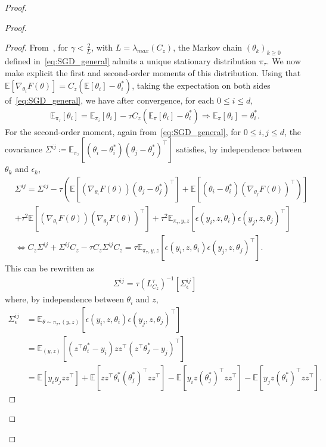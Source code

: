 \documentclass[11pt]{article}
\newcommand{\eqdef}{\coloneqq}
\newcommand{\EE}{\mathbb{E}}
\begin{document}
\begin{proof}
\begin{proof}
\begin{proof}
From~\cite[Proposition 2, Example 1]{dieuleveut2020bridging}, for $\gamma < \frac{2}{L}$, with $L = \lambda_{max}(C_z)$, the Markov chain $(\theta_k)_{k \geq 0}$ defined in~\eqref{eq:SGD_general} admits a unique stationary distribution $\pi_\tau$. We now make explicit the first and second-order moments of this distribution.  Using that $\EE[\nabla_{\theta_i} F(\theta)] = C_z( \EE[\theta_i] - \theta_i^*) $, taking the expectation on both sides of~\eqref{eq:SGD_general}, we have after convergence, for each $0 \leq i \leq d$,
\begin{align*}
\EE_{\pi_\tau}[\theta_i] = \EE_{\pi_i}[\theta_i] - \tau C_z( \EE_{\pi}[\theta_i] - \theta_i^*) \Longrightarrow \EE_{\pi}[\theta_i] = \theta_i^* .
\end{align*}
For the second-order moment, again from~\eqref{eq:SGD_general}, for $0 \leq i,j \leq d$, the covariance ${\Sigma^{ij} \eqdef \EE_{\pi_\tau}\left[(\theta_i -  \theta_i^*)(\theta_j - \theta_j^*)^\top\right]}$ satisfies, by independence between $\theta_k$ and $\epsilon_k$,
\begin{align*}
&\Sigma^{ij} = \Sigma^{ij} - \tau \left( \EE\left[(\nabla_{\theta_i} F(\theta))(\theta_j -  \theta_j^*)^\top\right] + \EE\left[(\theta_i -  \theta_i^*)  (\nabla_{\theta_j} F(\theta))^\top\right)\right] \\ \nonumber &+ \tau^2 \EE\left[(\nabla_{\theta_i} F(\theta)) (\nabla_{\theta_j} F(\theta))^\top \right] + \tau^2   \EE_{\pi_\tau, y,z}[\epsilon(y_i,z, \theta_i) \epsilon(y_j, z, \theta_j)^\top ] \\
&\Leftrightarrow C_z \Sigma^{ij} +  \Sigma^{ij} C_z - \tau C_z \Sigma^{ij} C_z  = \tau \EE_{\pi_\tau, y,z}[\epsilon(y_i,z, \theta_i) \epsilon(y_j, z, \theta_j)^\top ].
\end{align*} 
This can be rewritten as 
\begin{align*}
\Sigma^{ij} = \tau (L_{ C_z}^\tau)^{-1} [\Sigma_\epsilon^{ij}] 
\end{align*}
where, by independence between $\theta_i$ and $z$,
\begin{align*}
\Sigma_\epsilon^{ij} &= \EE_{\theta \sim \pi_\tau, (y, z)} [  \epsilon(y_i,z,\theta_i) \epsilon(y_j, z, \theta_j)^\top ] \\
&= \EE_{(y, z)} [  (z^\top \theta^*_i- y_i)z z^\top (z^\top \theta^*_j- y_j)^\top] \\
&= \EE[y_i y_j z z^\top] + \EE[z z^\top \theta_i^*(\theta_j^*)^\top z z^\top] - \EE[y_i z (\theta_j^*)^\top z z^\top] - \EE[y_j z (\theta_i^*)^\top z z^\top] .
\end{align*}
\end{proof}




\end{proof}
\end{proof}
\end{document}
